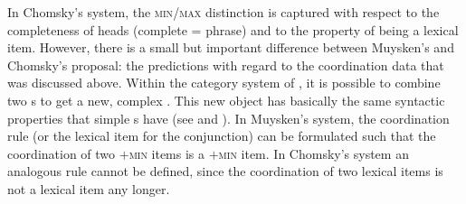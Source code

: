 In Chomsky's system, the \textsc{min}/\textsc{max} distinction is captured with respect to the completeness
of heads (complete = phrase) and to the property of being a lexical item. However, there is a small
but important difference between Muysken's and Chomsky's proposal: the predictions with regard to
the coordination data that was discussed above. Within the category system of \xbart, it is possible
to combine two \xzero{}s to get a new, complex \xzero. This new object has basically the same
syntactic properties that simple \xzero{}s have (see \citealp[]{Jackendoff77a} and
\citealp*{GKPS85a}). In Muysken's system, the coordination rule (or the lexical item for the
conjunction) can be formulated such that the coordination of two $+$\textsc{min} items is a $+$\textsc{min}
item. In Chomsky's system an analogous rule cannot be defined, since the coordination of two lexical
items is not a lexical item any longer.

